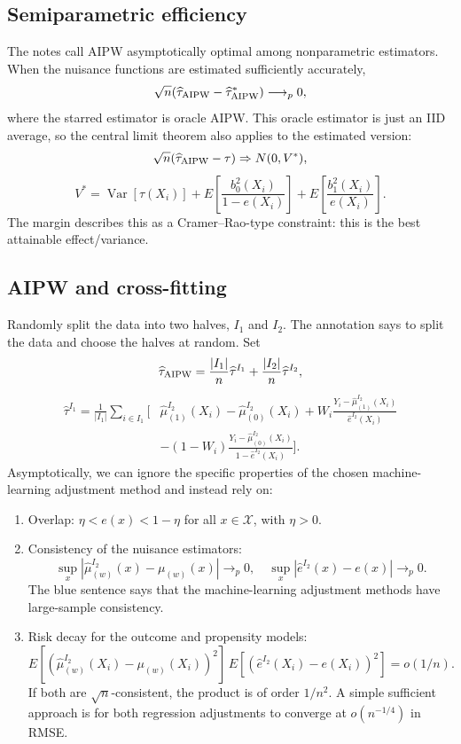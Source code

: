 \subsection{Semiparametric efficiency}
The notes call AIPW asymptotically optimal among nonparametric estimators. When the nuisance functions are estimated sufficiently accurately,
\[
\sqrt n(\widehat\tau_{\rm AIPW}-\widehat\tau^*_{\rm AIPW})\longrightarrow_p0,
\]
where the starred estimator is oracle AIPW. This oracle estimator is just an IID average, so the central limit theorem also applies to the estimated version:
\[
\sqrt n(\widehat\tau_{\rm AIPW}-\tau)\Rightarrow N(0,V^*),
\]
\[
V^*=\operatorname{Var}[\tau(X_i)]
+E\left[\frac{b_0^2(X_i)}{1-e(X_i)}\right]
+E\left[\frac{b_1^2(X_i)}{e(X_i)}\right].
\]
The margin describes this as a Cramer--Rao-type constraint: this is the best attainable effect/variance.
\subsection{AIPW and cross-fitting}
Randomly split the data into two halves, $I_1$ and $I_2$. The annotation says to split the data and choose the halves at random. Set
\[
\widehat\tau_{\rm AIPW}=\frac{|I_1|}{n}\widehat\tau^{I_1}
+\frac{|I_2|}{n}\widehat\tau^{I_2},
\]
\begin{align*}
\widehat\tau^{I_1}=\frac1{|I_1|}\sum_{i\in I_1}\bigg[&\widehat\mu_{(1)}^{I_2}(X_i)-\widehat\mu_{(0)}^{I_2}(X_i)
+W_i\frac{Y_i-\widehat\mu_{(1)}^{I_2}(X_i)}{\widehat e^{I_2}(X_i)}\\
&-(1-W_i)\frac{Y_i-\widehat\mu_{(0)}^{I_2}(X_i)}{1-\widehat e^{I_2}(X_i)}\bigg].
\end{align*}
Asymptotically, we can ignore the specific properties of the chosen machine-learning adjustment method and instead rely on:
\begin{enumerate}
\item Overlap: $\eta<e(x)<1-\eta$ for all $x\in\mathcal X$, with $\eta>0$.
\item Consistency of the nuisance estimators:
\[
\sup_x|\widehat\mu_{(w)}^{I_2}(x)-\mu_{(w)}(x)|\longrightarrow_p0,
\quad \sup_x|\widehat e^{I_2}(x)-e(x)|\longrightarrow_p0.
\]
The blue sentence says that the machine-learning adjustment methods have large-sample consistency.
\item Risk decay for the outcome and propensity models:
\[
E[(\widehat\mu_{(w)}^{I_2}(X_i)-\mu_{(w)}(X_i))^2]\,
E[(\widehat e^{I_2}(X_i)-e(X_i))^2]=o(1/n).
\]
If both are $\sqrt n$-consistent, the product is of order $1/n^2$. A simple sufficient approach is for both regression adjustments to converge at $o(n^{-1/4})$ in RMSE.
\end{enumerate}
